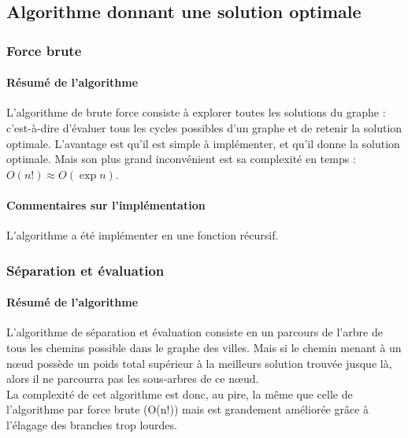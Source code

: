 \documentclass[10pt,a4paper]{report}
\begin{document}
	\subsection{Algorithme donnant une solution optimale}
		\subsubsection{Force brute}
		
		\paragraph{Résumé de l'algorithme}
		\begin{flushleft}
		L'algorithme de brute force consiste à explorer toutes les solutions du graphe : c'est-à-dire d'évaluer tous les cycles possibles d'un graphe et de retenir la solution optimale.
		L'avantage est qu'il est simple à implémenter, et qu'il donne la solution optimale.
		Mais son plus grand inconvénient est sa complexité en temps :  $O(n!) \approx O(\exp n)$.
		\end{flushleft}
		\paragraph{Commentaires sur l'implémentation}
		\begin{flushleft}
		L'algorithme a été implémenter en une fonction récursif.
		\end{flushleft}
		\subsubsection{Séparation et évaluation}
		
		\paragraph{Résumé de l'algorithme}
		\begin{flushleft}	
		L'algorithme de séparation et évaluation consiste en un parcours de l'arbre de tous les chemins possible dans le graphe des villes. Mais si le chemin menant à un nœud possède un poids total supérieur à la meilleurs solution trouvée jusque là, alors il ne parcourra pas les sous-arbres de ce nœud.\\
		La complexité de cet algorithme est donc, au pire, la même que celle de l'algorithme par force brute (O(n!)) mais est grandement améliorée grâce à l'élagage des branches trop lourdes.\\
		\end{flushleft}
		
\end{document}
